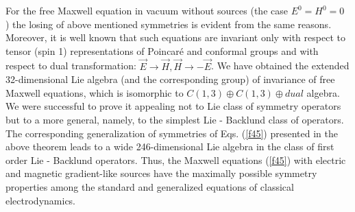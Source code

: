 \documentclass[a4paper,12pt]{article}
\begin{document}
For the free Maxwell equation in vacuum without sources (the case $E^0=H^0=0$%
) the losing of above mentioned symmetries is evident from the same reasons.
Moreover, it is well known that such equations are invariant only with
respect to tensor (spin 1) representations of Poincar\'e and conformal
groups and with respect to dual transformation: $\overrightarrow{E}%
\rightarrow \overrightarrow{H},\overrightarrow{H}\rightarrow -%
\overrightarrow{E}$. We have obtained the extended 32-dimensional Lie
algebra \cite{Ukr} (and the corresponding group) of invariance of free
Maxwell equations, which is isomorphic to $C(1,3)\oplus C(1,3)\oplus dual$
algebra. We were successful to prove it appealing not to Lie class of
symmetry operators but to a more general, namely, to the simplest Lie -
Backlund class of operators. The corresponding generalization of symmetries
of Eqs. (\ref{f45}) presented in the above theorem leads to a wide
246-dimensional Lie algebra in the class of first order Lie - Backlund
operators. Thus, the Maxwell equations (\ref{f45}) with electric and
magnetic gradient-like sources have the maximally possible symmetry
properties among the standard and generalized equations of classical
electrodynamics.
\end{document}
